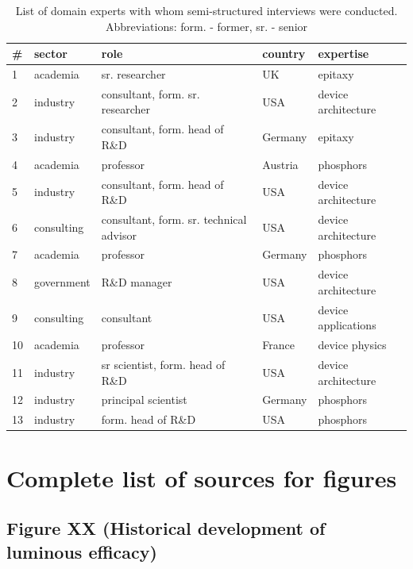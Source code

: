 \documentclass[10pt]{article}
\begin{document}
\begin{table}[!ht]
    \centering
    \begin{tabular}{|l|l|l|l|l|}
    \hline
        \# & sector & role & country & expertise \\ \hline
        1 & academia & sr. researcher & UK & epitaxy \\ \hline
        2 & industry & consultant, form. sr. researcher & USA & device architecture \\ \hline
        3 & industry & consultant, form. head of R\&D & Germany & epitaxy \\ \hline
        4 & academia & professor & Austria & phosphors \\ \hline
        5 & industry & consultant, form. head of R\&D & USA & device architecture \\ \hline
        6 & consulting & consultant, form. sr. technical advisor & USA & device architecture \\ \hline
        7 & academia & professor & Germany & phosphors \\ \hline
        8 & government & R\&D manager & USA & device architecture \\ \hline
        9 & consulting & consultant & USA & device applications \\ \hline
        10 & academia & professor & France & device physics \\ \hline
        11 & industry & sr scientist, form. head of R\&D & USA & device architecture \\ \hline
        12 & industry & principal scientist & Germany & phosphors \\ \hline
        13 & industry & form. head of R\&D & USA & phosphors \\ \hline
    \end{tabular}
    \label{tab:interviews}
    \caption{List of domain experts with whom semi-structured interviews were conducted. \\ Abbreviations: form. - former, sr. - senior}
\end{table}

\newpage
\section{Complete list of sources for figures}

\subsection{Figure XX (Historical development of luminous efficacy)}
\end{document}
